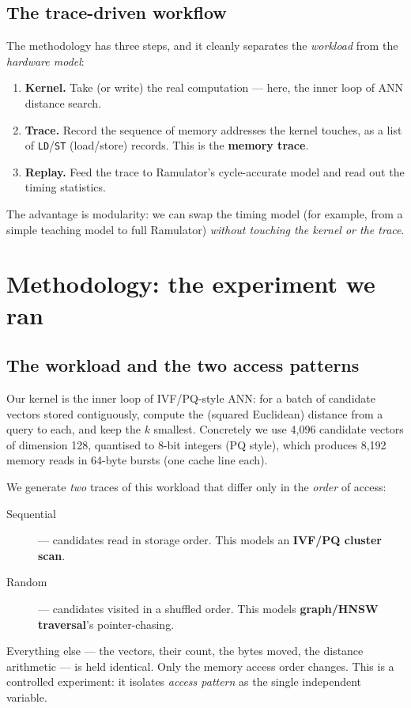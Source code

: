 \documentclass[11pt,a4paper]{article}
\newcommand{\term}[1]{\textbf{\color{slate}#1}}
\begin{document}
\subsection{The trace-driven workflow}

The methodology has three steps, and it cleanly separates the \emph{workload} from the
\emph{hardware model}:

\begin{enumerate}
\item \textbf{Kernel.} Take (or write) the real computation --- here, the inner loop of ANN distance
search.
\item \textbf{Trace.} Record the sequence of memory addresses the kernel touches, as a list of
\texttt{LD}/\texttt{ST} (load/store) records. This is the \term{memory trace}.
\item \textbf{Replay.} Feed the trace to Ramulator's cycle-accurate model and read out the timing
statistics.
\end{enumerate}

The advantage is modularity: we can swap the timing model (for example, from a simple teaching model
to full Ramulator) \emph{without touching the kernel or the trace}.

\section{Methodology: the experiment we ran}

\subsection{The workload and the two access patterns}

Our kernel is the inner loop of IVF/PQ-style ANN: for a batch of candidate vectors stored
contiguously, compute the (squared Euclidean) distance from a query to each, and keep the
$k$ smallest. Concretely we use 4{,}096 candidate vectors of dimension 128, quantised to 8-bit
integers (PQ style), which produces 8{,}192 memory reads in 64-byte bursts (one cache line each).

We generate \emph{two} traces of this workload that differ only in the \emph{order} of access:
\begin{description}
\item[Sequential] --- candidates read in storage order. This models an \textbf{IVF/PQ cluster scan}.
\item[Random] --- candidates visited in a shuffled order. This models \textbf{graph/HNSW traversal}'s
pointer-chasing.
\end{description}
Everything else --- the vectors, their count, the bytes moved, the distance arithmetic --- is held
identical. Only the memory access order changes. This is a controlled experiment: it isolates
\emph{access pattern} as the single independent variable.
\end{document}

